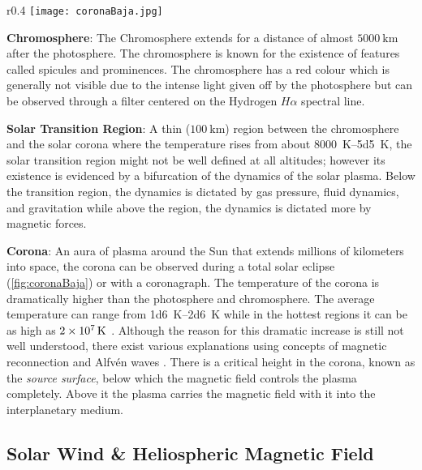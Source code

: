 \begin{wrapfigure}{r}{0.4\textwidth}
    \centering\texttt{[image: coronaBaja.jpg]}
    \caption{
        {\small 
            Sun's corona captured during a solar eclipse. \\ 
            \textit{Source}: Steve Albers, Boulder, CO; Dennis DiCicco, Sky and Telescope; 
            Gary Emerson, E. E. Barnard Observatory
        }
    }
    \label{fig:coronaBaja}
\end{wrapfigure}


\textbf{Chromosphere}: The Chromosphere extends for a distance of almost $\SI{5000}{\kilo\metre}$ 
after the photosphere. The chromosphere is known for the existence of features called spicules and 
prominences. The chromosphere has a red colour which is generally not visible due to the intense 
light given off by the photosphere but can be observed through a filter centered on the Hydrogen 
$H\alpha$ spectral line. %

\textbf{Solar Transition Region}: A thin ($\SI{100}{\kilo\metre}$) region between the chromosphere 
and the solar corona where the temperature rises from about \SIrange{8000}{5d5}{\kelvin}, the solar 
transition region might not be well defined at all altitudes; however its existence is evidenced by 
a bifurcation of the dynamics of the solar plasma. Below the transition region, the dynamics is 
dictated by gas pressure, fluid dynamics, and gravitation while above the region, the dynamics is 
dictated more by magnetic forces.

\textbf{Corona}: An aura of plasma around the Sun that extends millions of kilometers into space, 
the corona can be observed during a total solar eclipse (\cref{fig:coronaBaja}) or with a 
coronagraph. The temperature of the corona is dramatically higher than the photosphere and 
chromosphere. The average temperature can range from \SIrange{1d6}{2d6}{\kelvin} while in the 
hottest regions it can be as high as $\SI{2d7}{\kelvin}$ \citep{SolarCorona}. Although the reason 
for this dramatic increase is still not well understood, there exist various explanations using 
concepts of magnetic reconnection \citep{russell2001solar,SolarCorona} and Alfv\'en waves 
\citep{AlfvenCorona}. There is a critical height in the corona, known as the \emph{source surface}, 
below which the magnetic field controls the plasma completely. Above it the plasma carries 
the magnetic field with it into the interplanetary medium.


\subsection{Solar Wind \& Heliospheric Magnetic Field}\label{sec:hmfsolarwind}

